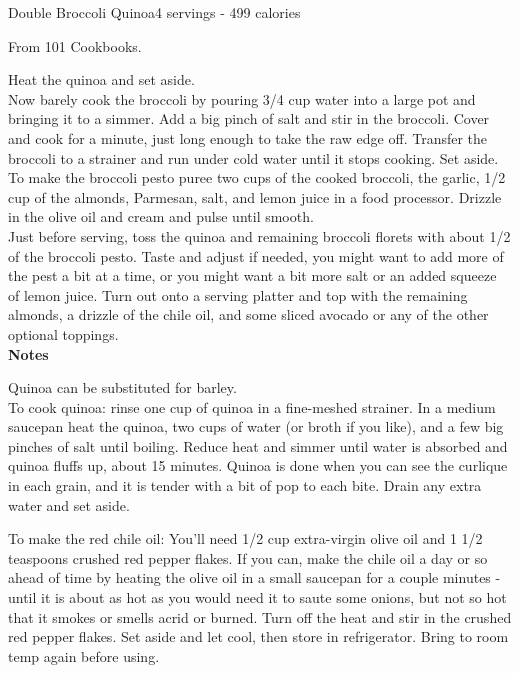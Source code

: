 \begin{recipe}{Double Broccoli Quinoa}{4 servings - 499 calories}{}

\freeform From 101 Cookbooks.


Heat the quinoa and set aside.\\

Now barely cook the broccoli by pouring 3/4 cup water into a large pot and bringing it to a simmer. Add a big pinch of salt and stir in the broccoli. Cover and cook for a minute, just long enough to take the raw edge off. Transfer the broccoli to a strainer and run under cold water until it stops cooking. Set aside.\\

To make the broccoli pesto puree two cups of the cooked broccoli, the garlic, 1/2 cup of the almonds, Parmesan, salt, and lemon juice in a food processor. Drizzle in the olive oil and cream and pulse until smooth.\\

Just before serving, toss the quinoa and remaining broccoli florets with about 1/2 of the broccoli pesto. Taste and adjust if needed, you might want to add more of the pest a bit at a time, or you might want a bit more salt or an added squeeze of lemon juice. Turn out onto a serving platter and top with the remaining almonds, a drizzle of the chile oil, and some sliced avocado or any of the other optional toppings.\\

\textbf{Notes}

Quinoa can be substituted for barley.\\

To cook quinoa: rinse one cup of quinoa in a fine-meshed strainer. In a medium saucepan heat the quinoa, two cups of water (or broth if you like), and a few big pinches of salt until boiling. Reduce heat and simmer until water is absorbed and quinoa fluffs up, about 15 minutes. Quinoa is done when you can see the curlique in each grain, and it is tender with a bit of pop to each bite. Drain any extra water and set aside.\newpage

To make the red chile oil: You'll need 1/2 cup extra-virgin olive oil and 1 1/2 teaspoons crushed red pepper flakes. If you can, make the chile oil a day or so ahead of time by heating the olive oil in a small saucepan for a couple minutes - until it is about as hot as you would need it to saute some onions, but not so hot that it smokes or smells acrid or burned. Turn off the heat and stir in the crushed red pepper flakes. Set aside and let cool, then store in refrigerator. Bring to room temp again before using.

\end{recipe}